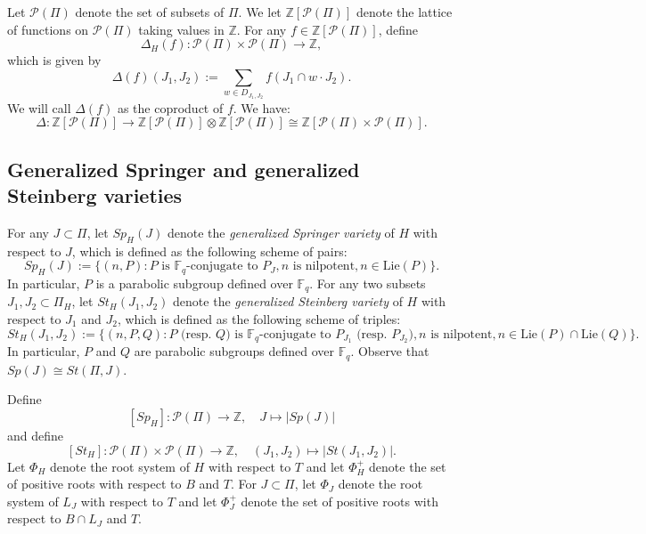 \documentclass{amsart}
\theoremstyle{plain}
\theoremstyle{definition}
\theoremstyle{remark}
\begin{document}
Let $\mathcal{P}(\Pi)$ denote the set of subsets of $\Pi$. 
We let $\mathbb{Z}[\mathcal{P}(\Pi)]$ denote the lattice of functions on $\mathcal{P}(\Pi)$ taking values in $\mathbb{Z}$.
For any $f\in\mathbb{Z}[\mathcal{P}(\Pi)]$, define 
\[
\Delta_{H}(f):\mathcal{P}(\Pi)\times\mathcal{P}(\Pi)\rightarrow\mathbb{Z},
\]
which is given by 
\[
\Delta(f)(J_1,J_2):=\sum_{w\in D_{J_{1},J_{2}}}f(J_{1}\cap w\cdot J_{2}).
\]
We will call $\Delta(f)$ as the coproduct of $f$. We have:
\[
\Delta: \mathbb{Z}[\mathcal{P}(\Pi)]\rightarrow \mathbb{Z}[\mathcal{P}(\Pi)]\otimes\mathbb{Z}[\mathcal{P}(\Pi)]\cong\mathbb{Z}[\mathcal{P}(\Pi)\times\mathcal{P}(\Pi)].
\]
\subsection{Generalized Springer and generalized Steinberg varieties}\label{3.2}
For any $J\subset \Pi$, let $Sp_{H}(J)$ denote the \emph{generalized Springer variety} of $H$ with respect to $J$, which is defined as the following scheme of pairs:
\[
Sp_{H}(J):=\{(n,P):P \text{ is $\mathbb{F}_{q}$-conjugate to }P_{J},n \text{ is nilpotent}, n\in \text{Lie}(P)\}.
\]
In particular, $P$ is a parabolic subgroup defined over $\mathbb{F}_{q}$.
For any two subsets $J_1, J_2\subset \Pi_H$, let $St_{H}(J_1,J_2)$ denote the \emph{generalized Steinberg variety} of $H$ with respect to $J_1$ and $J_2$, which is defined as the following scheme of triples:
\[
St_{H}(J_1,J_2):=\{(n,P,Q):P \text{ (resp. }Q)\text{ is $\mathbb{F}_{q}$-conjugate to }P_{J_{1}}\text{ (resp. }P_{J_{2}}), n\text{ is nilpotent}, n\in \text{Lie}(P)\cap \text{Lie}(Q)\}.
\]
In particular, $P$ and $Q$ are parabolic subgroups defined over $\mathbb{F}_{q}$. Observe that $Sp(J)\cong St(\Pi,J)$.

Define
\[
[Sp_H]:\mathcal{P}(\Pi)\rightarrow\mathbb{Z},
\quad J\mapsto|Sp(J)|
\]
and define
\[
[St_H]:\mathcal{P}(\Pi)\times\mathcal{P}(\Pi)\rightarrow\mathbb{Z},\quad (J_1,J_2)\mapsto|St(J_1,J_2)|.
\]
Let $\Phi_{H}$ denote the root system of $H$ with respect to $T$ and let $\Phi_{H}^{+}$ denote the set of positive roots with respect to $B$ and $T$. For $J\subset\Pi$, let $\Phi_{J}$ denote the root system of $L_J$ with respect to $T$ and let $\Phi_{J}^{+}$ denote the set of positive roots with respect to $B\cap L_J$ and $T$.
\end{document}
